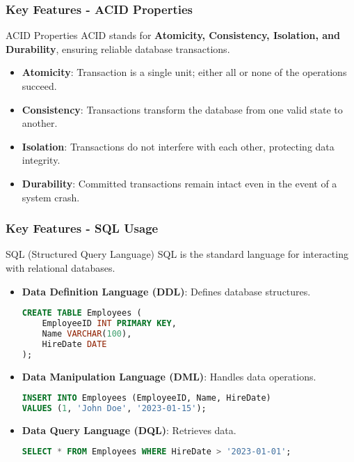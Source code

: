 \documentclass[aspectratio=169]{beamer}
\begin{document}
\begin{frame}[fragile]
    \frametitle{Key Features - ACID Properties}
    \begin{block}{ACID Properties}
        ACID stands for \textbf{Atomicity, Consistency, Isolation, and Durability}, ensuring reliable database transactions.
    \end{block}
    \begin{itemize}
        \item \textbf{Atomicity}: Transaction is a single unit; either all or none of the operations succeed.
        \item \textbf{Consistency}: Transactions transform the database from one valid state to another.
        \item \textbf{Isolation}: Transactions do not interfere with each other, protecting data integrity.
        \item \textbf{Durability}: Committed transactions remain intact even in the event of a system crash.
    \end{itemize}
\end{frame}

\begin{frame}[fragile]
    \frametitle{Key Features - SQL Usage}
    \begin{block}{SQL (Structured Query Language)}
        SQL is the standard language for interacting with relational databases.
    \end{block}
    \begin{itemize}
        \item \textbf{Data Definition Language (DDL)}: Defines database structures.
        \begin{lstlisting}[language=SQL]
CREATE TABLE Employees (
    EmployeeID INT PRIMARY KEY,
    Name VARCHAR(100),
    HireDate DATE
);
        \end{lstlisting}
        
        \item \textbf{Data Manipulation Language (DML)}: Handles data operations.
        \begin{lstlisting}[language=SQL]
INSERT INTO Employees (EmployeeID, Name, HireDate)
VALUES (1, 'John Doe', '2023-01-15');
        \end{lstlisting}
        
        \item \textbf{Data Query Language (DQL)}: Retrieves data.
        \begin{lstlisting}[language=SQL]
SELECT * FROM Employees WHERE HireDate > '2023-01-01';
        \end{lstlisting}
    \end{itemize}
\end{frame}
\end{document}
